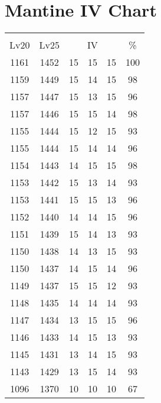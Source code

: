 \documentclass{article}%
\begin{document}
%
\normalsize%
\section{Mantine IV Chart}%
\label{sec:Mantine IV Chart}%
\renewcommand{\arraystretch}{1.5}%
\begin{tabular}{|c|c|c|c|c|c|}%
\hline%
\multicolumn{6}{|c|}{\textcolor{white}{ 
\linebreak{Mantine}
}%
\cellcolor{black}}\\%
\multicolumn{1}{|c}{Lv20}&\multicolumn{1}{c|}{Lv25}&\multicolumn{3}{c|}{IV}&\multicolumn{1}{|c|}{\%}\\%
\hline%
\rowcolor{color100}%
1161&1452&15&15&15&100\\%
\hline%
\rowcolor{color98}%
1159&1449&15&14&15&98\\%
\hline%
\rowcolor{color96}%
1157&1447&15&13&15&96\\%
\hline%
\rowcolor{color98}%
1157&1446&15&15&14&98\\%
\hline%
\rowcolor{color93}%
1155&1444&15&12&15&93\\%
\hline%
\rowcolor{color96}%
1155&1444&15&14&14&96\\%
\hline%
\rowcolor{color98}%
1154&1443&14&15&15&98\\%
\hline%
\rowcolor{color93}%
1153&1442&15&13&14&93\\%
\hline%
\rowcolor{color96}%
1153&1441&15&15&13&96\\%
\hline%
\rowcolor{color96}%
1152&1440&14&14&15&96\\%
\hline%
\rowcolor{color93}%
1151&1439&15&14&13&93\\%
\hline%
\rowcolor{color93}%
1150&1438&14&13&15&93\\%
\hline%
\rowcolor{color96}%
1150&1437&14&15&14&96\\%
\hline%
\rowcolor{color93}%
1149&1437&15&15&12&93\\%
\hline%
\rowcolor{color93}%
1148&1435&14&14&14&93\\%
\hline%
\rowcolor{color96}%
1147&1434&13&15&15&96\\%
\hline%
\rowcolor{color93}%
1146&1433&14&15&13&93\\%
\hline%
\rowcolor{color93}%
1145&1431&13&14&15&93\\%
\hline%
\rowcolor{color93}%
1143&1429&13&15&14&93\\%
\hline%
\rowcolor{color91}%
1096&1370&10&10&10&67\\%
\end{tabular}

%
\end{document}
